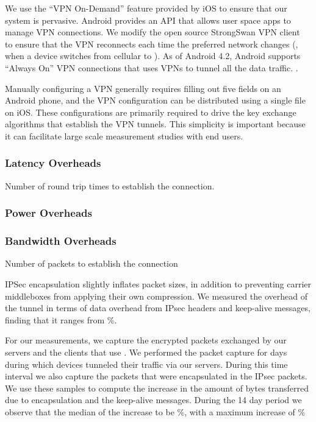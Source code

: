 We use the ``VPN On-Demand'' feature provided by iOS to ensure that our system is pervasive. Android provides an API that allows user space apps to manage VPN
connections. We modify the open source StrongSwan VPN
client~\cite{strongswanclient} to ensure that the VPN reconnects each time
the preferred network changes (\eg, when a device switches from cellular to
\wifi). As of Android 4.2, Android supports ``Always On'' VPN connections
that uses VPNs to tunnel all the data traffic. .

Manually configuring a VPN generally requires filling out five fields on an
Android phone, and the VPN configuration can be distributed using a single
file on iOS. These configurations are primarily required to drive the key
exchange algorithms that establish the VPN tunnels. This simplicity is
important because it can facilitate large scale measurement studies with
end users.  

\subsubsection{Latency Overheads}
Number of round trip times to establish the connection. 

\subsubsection{Power Overheads}

\subsubsection{Bandwidth Overheads} 

Number of packets to establish the connection 

IPSec encapsulation slightly inflates packet sizes, in addition to
preventing carrier middleboxes from applying their own compression. We
measured the overhead of the tunnel in terms of data overhead from IPsec
headers and keep-alive messages, finding that it ranges from \%.

For our measurements, we capture the encrypted packets exchanged by our
servers and the clients that use \meddle. We performed the packet capture
for  days during which  devices tunneled their
traffic via our  servers. During this time interval we also capture the
packets that were encapsulated in the IPsec packets. We use these samples
to compute the increase in the amount of bytes transferred due to
encapsulation and the keep-alive messages. During the 14 day period we
observe that the median of the increase to be \%, with a maximum
increase of \%

